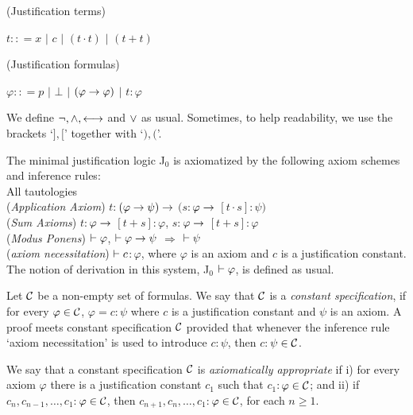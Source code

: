 \begin{defn} (Justification terms)
	\begin{center}
		$ t :: = x$   $|$ $c$ $|$  $(t \cdot t)$ $|$ $(t + t)$ 
	\end{center}
\end{defn}



\begin{defn} (Justification formulas)
	\begin{center}
		$ \varphi :: = p$   $|$ $\bot$ $|$  $(\varphi \rightarrow \varphi)$ $|$ $t$$:$$\varphi$
	\end{center}
\end{defn}

\qquad We define $\neg, \wedge, \longleftrightarrow$ and $\vee$ as usual. Sometimes, to help readability, we use the brackets `$],[$' together with `$),($'.

\qquad The minimal justification logic J$_{0}$ is axiomatized by the following axiom schemes and inference rules:\\

All tautologies\\

(\textit{Application Axiom}) $t$$:$$(\varphi \rightarrow \psi) \rightarrow$ $(s$$:$$\varphi \rightarrow$ $[t\cdot s]$$:$$\psi)$\\

(\textit{Sum Axioms}) $t$$:$$\varphi \rightarrow$ $[t+s]$$:$$\varphi$, $s$$:$$\varphi \rightarrow$ $[t+s]$$:$$\varphi$\\

(\textit{Modus Ponens}) $\vdash \varphi$, $\vdash \varphi\rightarrow\psi$ $\Rightarrow$ $\vdash \psi$ \\

(\textit{axiom necessitation})  $\vdash c$$:$$\varphi$, where $\varphi$ is an axiom and $c$ is a justification constant.\\

\qquad The notion of derivation in this system, J$_{0}$ $\vdash \varphi$, is defined as usual. 

\begin{defn}
Let $\mathcal{C}$ be a non-empty set of formulas. We say that $\mathcal{C}$ is a \textit{constant specification}, if for every $\varphi \in \mathcal{C}$, $\varphi = c$$:$$\psi$ where $c$ is a justification constant and $\psi$ is an axiom. A proof meets constant specification $\mathcal{C}$ provided that whenever the inference rule `axiom necessitation' is used to introduce $c$$:$$\psi$, then $c$$:$$\psi \in \mathcal{C}$.

\qquad We say that a constant specification $\mathcal{C}$ is \textit{axiomatically appropriate} if i) for every axiom $\varphi$ there is a justification constant $c_{1}$ such that $c_{1}$$:$$\varphi\in \mathcal{C}$; and ii) if $c_n, c_{n-1}, \dots , c_{1}$$:$$\varphi\in \mathcal{C}$, then $c_{n+1}, c_{n}, \dots , c_{1}$$:$$\varphi\in \mathcal{C}$, for each $n \geq 1$. 	
\end{defn}


